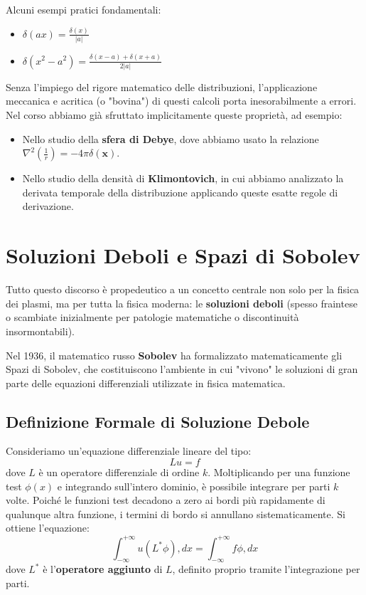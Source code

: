 Alcuni esempi pratici fondamentali:
\begin{itemize}
\item $\delta(ax) = \frac{\delta(x)}{\vert{}a\vert{}}$
\item $\delta(x^2 - a^2) = \frac{\delta(x - a) + \delta(x + a)}{2\vert{}a\vert{}}$
\end{itemize}
Senza l'impiego del rigore matematico delle distribuzioni, l'applicazione meccanica e acritica (o "bovina") di questi calcoli porta inesorabilmente a errori. Nel corso abbiamo già sfruttato implicitamente queste proprietà, ad esempio:
\begin{itemize}
\item Nello studio della \textbf{sfera di Debye}, dove abbiamo usato la relazione $\nabla^2 \left(\frac{1}{r}\right) = -4\pi\delta(\mathbf{x})$.
\item Nello studio della densità di \textbf{Klimontovich}, in cui abbiamo analizzato la derivata temporale della distribuzione applicando queste esatte regole di derivazione.
\end{itemize}

\section{Soluzioni Deboli e Spazi di Sobolev}

Tutto questo discorso è propedeutico a un concetto centrale non solo per la fisica dei plasmi, ma per tutta la fisica moderna: le \textbf{soluzioni deboli} (spesso fraintese o scambiate inizialmente per patologie matematiche o discontinuità insormontabili).

Nel 1936, il matematico russo \textbf{Sobolev} ha formalizzato matematicamente gli Spazi di Sobolev, che costituiscono l'ambiente in cui "vivono" le soluzioni di gran parte delle equazioni differenziali utilizzate in fisica matematica.

\subsection{Definizione Formale di Soluzione Debole}
Consideriamo un'equazione differenziale lineare del tipo:
\begin{equation}
L u = f
\end{equation}
dove $L$ è un operatore differenziale di ordine $k$.
Moltiplicando per una funzione test $\phi(x)$ e integrando sull'intero dominio, è possibile integrare per parti $k$ volte. Poiché le funzioni test decadono a zero ai bordi più rapidamente di qualunque altra funzione, i termini di bordo si annullano sistematicamente. Si ottiene l'equazione:
\begin{equation}
\int_{-\infty}^{+\infty} u (L^* \phi) , dx = \int_{-\infty}^{+\infty} f \phi , dx
\end{equation}
dove $L^*$ è l'\textbf{operatore aggiunto} di $L$, definito proprio tramite l'integrazione per parti.

